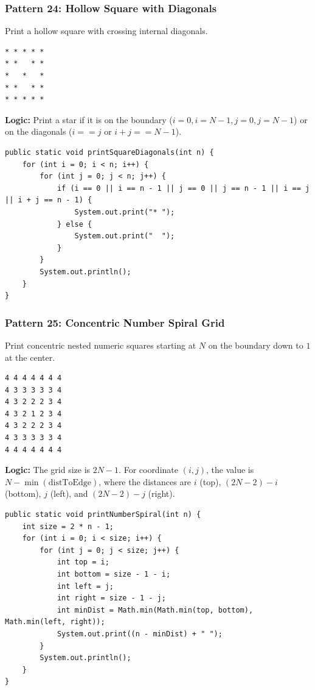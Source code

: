 \documentclass[12pt,a4paper,oneside]{book}
\begin{document}
\subsubsection{Pattern 24: Hollow Square with Diagonals}
Print a hollow square with crossing internal diagonals.
\begin{lstlisting}[frame=single]
* * * * *
* *   * *
*   *   *
* *   * *
* * * * *
\end{lstlisting}
\textbf{Logic:} Print a star if it is on the boundary ($i=0, i=N-1, j=0, j=N-1$) or on the diagonals ($i == j$ or $i + j == N-1$).
\begin{lstlisting}[caption={Hollow Square with Diagonals}]
public static void printSquareDiagonals(int n) {
    for (int i = 0; i < n; i++) {
        for (int j = 0; j < n; j++) {
            if (i == 0 || i == n - 1 || j == 0 || j == n - 1 || i == j || i + j == n - 1) {
                System.out.print("* ");
            } else {
                System.out.print("  ");
            }
        }
        System.out.println();
    }
}
\end{lstlisting}

\subsubsection{Pattern 25: Concentric Number Spiral Grid}
Print concentric nested numeric squares starting at $N$ on the boundary down to $1$ at the center.
\begin{lstlisting}[frame=single]
4 4 4 4 4 4 4
4 3 3 3 3 3 4
4 3 2 2 2 3 4
4 3 2 1 2 3 4
4 3 2 2 2 3 4
4 3 3 3 3 3 4
4 4 4 4 4 4 4
\end{lstlisting}
\textbf{Logic:} The grid size is $2N-1$. For coordinate $(i,j)$, the value is $N - \min(\text{distToEdge})$, where the distances are $i$ (top), $(2N-2)-i$ (bottom), $j$ (left), and $(2N-2)-j$ (right).
\begin{lstlisting}[caption={Concentric Number Spiral Grid}]
public static void printNumberSpiral(int n) {
    int size = 2 * n - 1;
    for (int i = 0; i < size; i++) {
        for (int j = 0; j < size; j++) {
            int top = i;
            int bottom = size - 1 - i;
            int left = j;
            int right = size - 1 - j;
            int minDist = Math.min(Math.min(top, bottom), Math.min(left, right));
            System.out.print((n - minDist) + " ");
        }
        System.out.println();
    }
}
\end{lstlisting}
\end{document}

